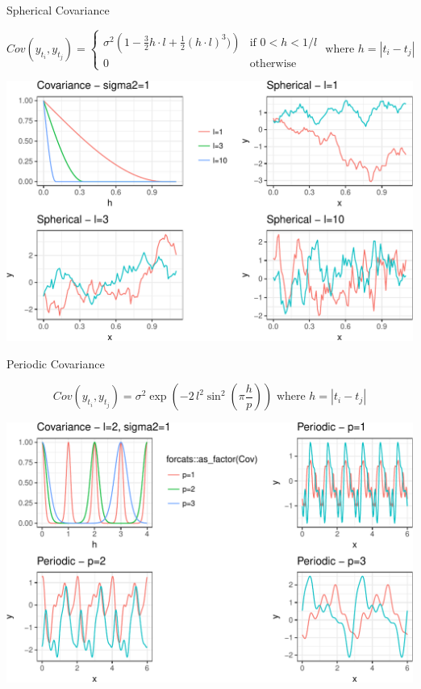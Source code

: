 \documentclass[11pt,ignorenonframetext,]{beamer}
\begin{document}
\begin{frame}[t]{%
\protect\hypertarget{spherical-covariance}{%
Spherical Covariance}}

\vspace{-10mm}
\footnotesize

\[ Cov(y_{t_i}, y_{t_j}) = \begin{cases}
\sigma^2\left(1 - \frac{3}{2} h \cdot l + \frac{1}{2} (h \cdot l)^3)\right) & \text{if   } 0 < h < 1/l \\
0 & \text{otherwise}
\end{cases} \text{   where } h = |t_i - t_j|\]

\begin{center}\includegraphics[width=\textwidth]{Lec14_files/figure-beamer/unnamed-chunk-5-1} \end{center}

\end{frame}

\begin{frame}[t]{%
\protect\hypertarget{periodic-covariance}{%
Periodic Covariance}}

\vspace{-10mm}

\[ Cov(y_{t_i}, y_{t_j}) = \sigma^2 \exp\left(-2\, l^2 \sin^2\left(\pi\frac{h}{p}\right)\right)  \text{   where } h = |t_i - t_j| \]

\begin{center}\includegraphics[width=\textwidth]{Lec14_files/figure-beamer/unnamed-chunk-6-1} \end{center}

\end{frame}
\end{document}
